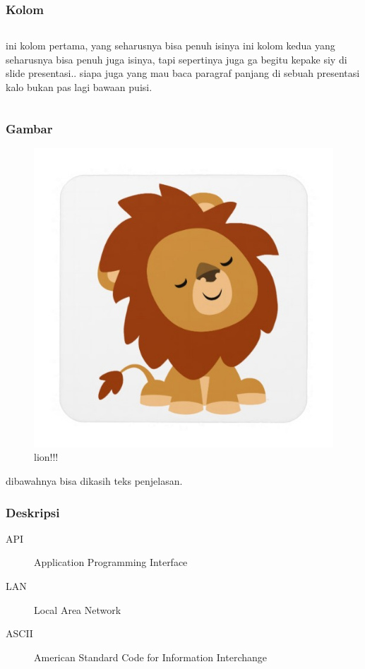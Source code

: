 \documentclass[handout]{beamer}
\begin{document}

\begin{frame}
\frametitle{Kolom}
\begin{columns}
ini kolom pertama, yang seharusnya bisa penuh isinya
ini kolom kedua yang seharusnya bisa penuh juga isinya, tapi sepertinya juga ga begitu kepake siy di slide presentasi.. siapa juga yang mau baca paragraf panjang di sebuah presentasi kalo bukan pas lagi bawaan puisi.
\end{columns}
\end{frame}



\begin{frame}
\frametitle{Gambar}
\begin{figure}
	\includegraphics[scale=0.25]{lion}
	\caption{lion!!!}
\end{figure}
dibawahnya bisa dikasih teks penjelasan.
\end{frame}



\begin{frame}
\frametitle{Deskripsi}
\begin{description}
\item [API] Application Programming Interface
\item [LAN] Local Area Network
\item [ASCII] American Standard Code for Information Interchange
\end{description}
\end{frame}
\end{document}
